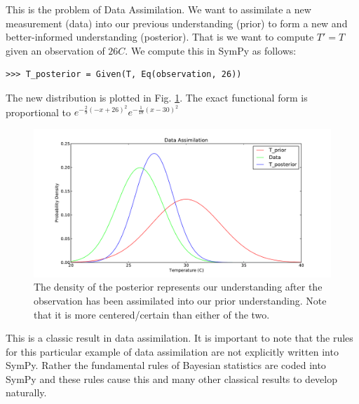 This is the problem of Data Assimilation. We want to assimilate a new
measurement (data) into our previous understanding (prior) to form a new and
better-informed understanding (posterior). That is we want to compute $T' = T$
given an observation of $26C$. We compute this in SymPy as follows:

\begin{lstlisting}
>>> T_posterior = Given(T, Eq(observation, 26))
\end{lstlisting}

The new distribution is plotted in Fig. \ref{fig:DA_posterior}. The exact
functional form is proportional to $e^{-\frac{2}{9} \left(-x + 26\right)^{2}}
e^{-\frac{1}{18} \left(x-30\right)^{2}}$

\begin{figure}[ht]
\vspace{-0pt}
\centering
\includegraphics[width=.7\textwidth]{images/posterior}
\vspace{-0pt}
\caption{The density of the posterior represents our understanding after the observation has been assimilated into our prior understanding. Note that it is more centered/certain than either of the two. }
\label{fig:DA_posterior}
\vspace{00pt}
\end{figure}

This is a classic result in data assimilation. It is important to note that
the rules for this particular example of data assimilation are not explicitly written into SymPy. Rather the fundamental rules of Bayesian statistics are coded into SymPy and these rules cause this and many other classical results to develop naturally.
